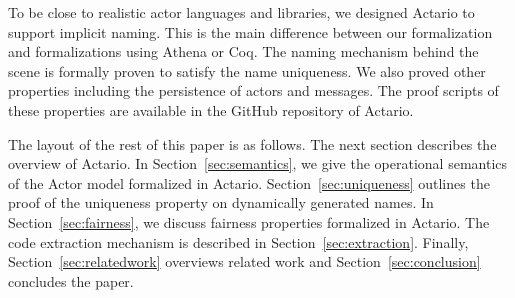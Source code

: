 To be close to realistic actor languages and libraries, we designed
Actario to support implicit naming. This is the main difference between
our formalization and formalizations using Athena\cite{Musser:2013aa}
or Coq\cite{Garnock-Jones:2014aa}. The naming mechanism behind the scene
is formally proven to satisfy the name uniqueness.  We also proved other
properties including the persistence of actors and messages.  The proof
scripts of these properties are available in the GitHub repository of
Actario\cite{Actario}.






The layout of the rest of this paper is as follows.
The next section describes the overview of Actario.
In Section~\ref{sec:semantics}, we give the operational semantics of the Actor model formalized in Actario.
Section~\ref{sec:uniqueness} outlines the proof of the uniqueness property on dynamically generated names.
In Section~\ref{sec:fairness}, we discuss fairness properties formalized in Actario.
The code extraction mechanism is described in Section~\ref{sec:extraction}.
Finally, Section~\ref{sec:relatedwork} overviews related work and Section~\ref{sec:conclusion} concludes the paper.

